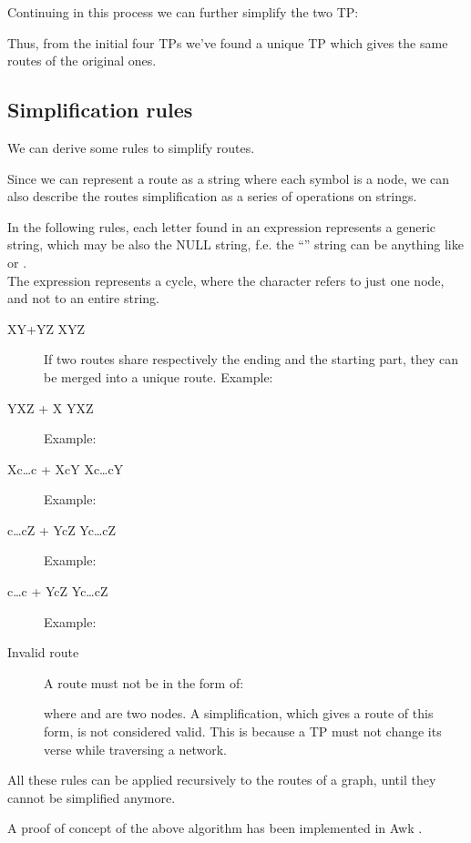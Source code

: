\documentclass[a4paper]{article}
\begin{document}
Continuing in this process we can further simplify the two TP:


Thus, from the initial four TPs we've found a unique TP which gives the same
routes of the original ones.

\subsection{Simplification rules}
\label{sec:simplification_rules}

We can derive some rules to simplify routes.

Since we can represent a route as a string where each symbol is a node, we can
also describe the routes simplification as a series of operations on strings.

In the following rules, each letter found in an expression represents a generic string,
which may be also the NULL string, f.e. the ``'' string can be anything like
 or .
\\
The  expression represents a cycle, where the  character refers
to just one node, and not to an entire string.
\begin{description}
	\item[XY+YZ  XYZ]
		If two routes share respectively the ending and the starting
		part, they can be merged into a unique route. Example:
		
	\item[YXZ + X  YXZ]
		Example:
		
	\item[Xc\dots c + XcY  Xc\dots cY]
		Example:
		
	\item[c\dots cZ + YcZ  Yc\dots cZ]
		Example:
		
	\item[c\dots c + YcZ  Yc\dots cZ]
		Example:
		
	\item[Invalid route]
		\label{sec:simroute_invalid}
		A route must not be in the form of:
		
		where  and  are two nodes.
		A simplification, which gives a route of this form, is
		not considered valid. This is because a TP must not change its
		verse while traversing a network.
\end{description}

All these rules can be applied recursively to the routes of a graph, until
they cannot be simplified anymore.

A proof of concept of the above algorithm has been implemented in Awk \cite{simrouteawk}.
\end{document}
